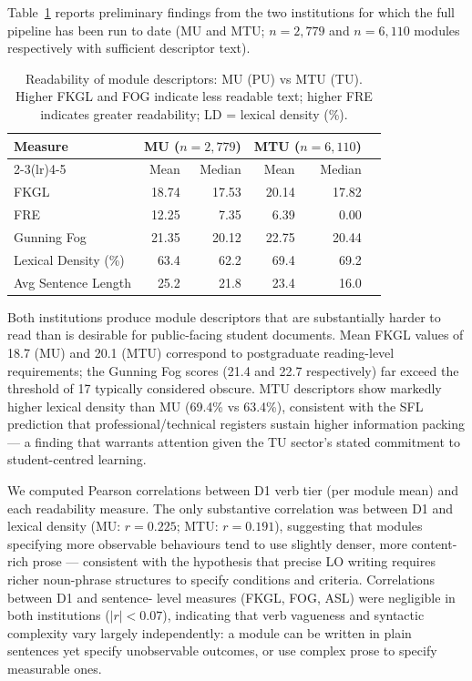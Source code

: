 \documentclass[12pt, a4paper]{article}
\begin{document}
Table~\ref{tab:readability} reports preliminary findings from the two institutions
for which the full pipeline has been run to date (MU and MTU; $n = 2{,}779$ and
$n = 6{,}110$ modules respectively with sufficient descriptor text).

\begin{table}[H]
\centering
\caption{Readability of module descriptors: MU (PU) vs MTU (TU). Higher FKGL and FOG
indicate less readable text; higher FRE indicates greater readability; LD = lexical
density (\%).}
\label{tab:readability}
\begin{tabular}{lrrrrr}
\toprule
Measure & \multicolumn{2}{c}{MU ($n=2{,}779$)} & \multicolumn{2}{c}{MTU ($n=6{,}110$)} \\
\cmidrule(lr){2-3}\cmidrule(lr){4-5}
 & Mean & Median & Mean & Median \\
\midrule
FKGL            & 18.74 & 17.53 & 20.14 & 17.82 \\
FRE             & 12.25 &  7.35 &  6.39 &  0.00 \\
Gunning Fog     & 21.35 & 20.12 & 22.75 & 20.44 \\
Lexical Density (\%) & 63.4 & 62.2 & 69.4 & 69.2 \\
Avg Sentence Length & 25.2 & 21.8 & 23.4 & 16.0 \\
\bottomrule
\end{tabular}
\end{table}

Both institutions produce module descriptors that are substantially harder to read
than is desirable for public-facing student documents. Mean FKGL values of 18.7 (MU)
and 20.1 (MTU) correspond to postgraduate reading-level requirements; the Gunning Fog
scores (21.4 and 22.7 respectively) far exceed the threshold of 17 typically considered
obscure. MTU descriptors show markedly higher lexical density than MU (69.4\% vs
63.4\%), consistent with the SFL prediction that professional/technical registers
sustain higher information packing \citep{halliday1989spoken} --- a finding that
warrants attention given the TU sector's stated commitment to student-centred learning.

We computed Pearson correlations between D1 verb tier (per module mean) and each
readability measure. The only substantive correlation was between D1 and lexical
density (MU: $r = 0.225$; MTU: $r = 0.191$), suggesting that modules specifying
more observable behaviours tend to use slightly denser, more content-rich prose ---
consistent with the hypothesis that precise LO writing requires richer noun-phrase
structures to specify conditions and criteria. Correlations between D1 and sentence-
level measures (FKGL, FOG, ASL) were negligible in both institutions ($|r| < 0.07$),
indicating that verb vagueness and syntactic complexity vary largely independently:
a module can be written in plain sentences yet specify unobservable outcomes, or use
complex prose to specify measurable ones.
\end{document}
